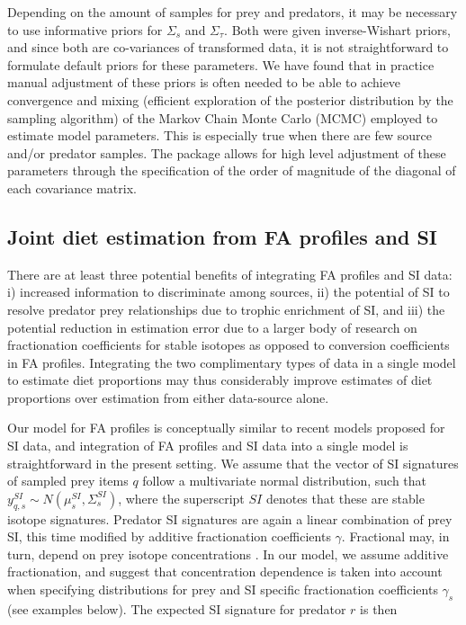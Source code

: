 \documentclass[fleqn,10pt]{wlpeerj}
\begin{document}
Depending on the amount of samples for prey and predators, it
may be necessary to use informative priors for $\Sigma_{s}$ and
$\Sigma_{\tau}$. Both were given inverse-Wishart priors, and since both are co-variances of transformed data, it is
not straightforward to formulate default priors for these parameters. We have found that in practice manual adjustment of these priors
is often needed to be able to achieve convergence and mixing
(efficient exploration of the posterior distribution by the sampling
algorithm) of the Markov Chain Monte Carlo (MCMC) employed to estimate
model parameters. This is especially true when there are few source and/or predator samples. The
package allows for high level adjustment of these parameters through
the specification of the order of magnitude of the diagonal of each
covariance matrix. 

\subsection*{Joint diet estimation from FA profiles and SI}
There are at least three potential benefits of integrating FA profiles and SI
data: i) increased information to discriminate among sources, ii) the
potential of SI to resolve predator prey relationships due to trophic
enrichment of SI, and iii) the potential reduction in estimation error
due to a larger body of research on fractionation coefficients for stable
isotopes as opposed to conversion coefficients in FA profiles. Integrating the two complimentary types of data
in a single model to estimate diet proportions may thus considerably
improve estimates of diet proportions over estimation from either
data-source alone.

Our model for FA profiles is conceptually similar to recent models proposed for SI data, and
integration of FA profiles and SI data into a single model is straightforward
in the present setting. We assume that the vector of SI signatures of
sampled prey
items $q$ follow a multivariate normal distribution, such that
$y_{q,s}^{SI} \sim N(\mu_s^{SI},\Sigma_s^{SI})$, where the superscript
$SI$ denotes that these are stable isotope signatures. Predator SI
signatures are again a linear combination of prey SI, this time
modified by additive fractionation coefficients
$\gamma$. Fractional may, in turn, depend on prey isotope concentrations
\citep{hussey_rescaling_2014,caut_variation_2009}. In our model, we
assume additive fractionation, and suggest that concentration
dependence is taken into account when specifying distributions for
prey and SI specific fractionation coefficients $\gamma_s$ (see
examples below). The expected SI signature for predator $r$ is then
\end{document}
